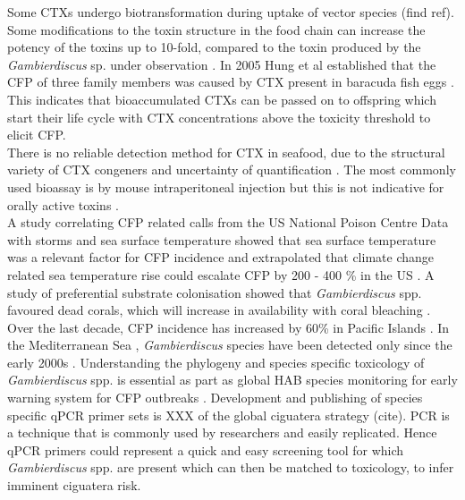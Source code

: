 \documentclass[12pt]{article}
\begin{document}
Some CTXs undergo biotransformation during uptake of vector species  {\huge (find ref}). %
Some modifications to the toxin structure in the food chain can increase the potency of the toxins up to 10-fold, compared to the toxin produced by the \emph{Gambierdiscus} sp. under observation \cite{lewis2006ciguatera}.
In 2005 Hung et al established that the CFP of three family members was caused by CTX present in baracuda fish eggs \cite{hung2005persistent}. This indicates that bioaccumulated CTXs can be passed on to offspring which start their life cycle with CTX concentrations above the toxicity threshold to elicit CFP.  \\ 
There is no reliable detection method for CTX in seafood, due to the structural variety of CTX congeners and uncertainty of quantification \cite{dickey2010ciguatera}. The most commonly used bioassay is by mouse intraperitoneal injection but this is not indicative for orally active toxins \cite{botana2014seafood}.\\
A study correlating CFP related calls from the US National Poison Centre Data with storms and sea surface temperature showed that sea surface temperature was a relevant factor for CFP incidence and extrapolated that climate change related sea temperature rise could escalate CFP by 200 - 400 \% in the US \cite{garces2012habitat}. %
A study of preferential substrate colonisation showed that \emph{Gambierdiscus} spp. favoured dead corals, which will increase in availability with coral bleaching \cite{grzebyk1994ecology}. Over the last decade, CFP incidence has increased by 60\% in Pacific Islands \cite{skinner2011ciguatera}. In the Mediterranean Sea \cite{lejeusne2010climate}, \emph{Gambierdiscus} species have been detected only since the early 2000s \cite{aligizaki2008morphological}.
Understanding the phylogeny and species specific toxicology of \emph{Gambierdiscus} spp. is essential as part as global HAB species monitoring for early warning system for CFP outbreaks \cite{berdalet2012global}. Development and publishing of species specific qPCR primer sets is XXX of the global ciguatera strategy (cite). PCR is a technique that is commonly used by researchers and easily replicated. Hence qPCR primers could represent a quick and easy screening tool for which \emph{Gambierdiscus} spp. are present which can then be matched to toxicology, to infer imminent ciguatera risk.

\end{document}
